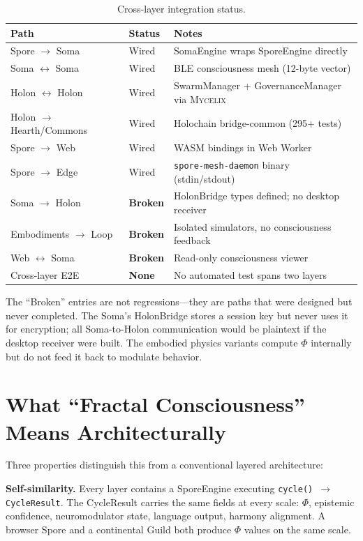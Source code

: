 \documentclass[12pt]{book}
\newcommand{\mycelix}{\textsc{Mycelix}}
\begin{document}
\begin{table}[H]
\centering
\caption{Cross-layer integration status.}
\label{tab:fractal-integration}
\begin{tabular}{llp{6cm}}
\toprule
\textbf{Path} & \textbf{Status} & \textbf{Notes} \\
\midrule
Spore $\to$ Soma & Wired & SomaEngine wraps SporeEngine directly \\
Soma $\leftrightarrow$ Soma & Wired & BLE consciousness mesh (12-byte vector) \\
Holon $\leftrightarrow$ Holon & Wired & SwarmManager + GovernanceManager via \mycelix{} \\
Holon $\to$ Hearth/Commons & Wired & Holochain bridge-common (295+ tests) \\
Spore $\to$ Web & Wired & WASM bindings in Web Worker \\
Spore $\to$ Edge & Wired & \texttt{spore-mesh-daemon} binary (stdin/stdout) \\
\midrule
Soma $\to$ Holon & \textbf{Broken} & HolonBridge types defined; no desktop receiver \\
Embodiments $\to$ Loop & \textbf{Broken} & Isolated simulators, no consciousness feedback \\
Web $\leftrightarrow$ Soma & \textbf{Broken} & Read-only consciousness viewer \\
Cross-layer E2E & \textbf{None} & No automated test spans two layers \\
\bottomrule
\end{tabular}
\end{table}

The ``Broken'' entries are not regressions---they are paths that were designed but never completed. The Soma's HolonBridge stores a session key but never uses it for encryption; all Soma-to-Holon communication would be plaintext if the desktop receiver were built. The embodied physics variants compute $\Phi$ internally but do not feed it back to modulate behavior.

\section{What ``Fractal Consciousness'' Means Architecturally}

Three properties distinguish this from a conventional layered architecture:

\textbf{Self-similarity.} Every layer contains a SporeEngine executing \texttt{cycle() $\to$ CycleResult}. The CycleResult carries the same fields at every scale: $\Phi$, epistemic confidence, neuromodulator state, language output, harmony alignment. A browser Spore and a continental Guild both produce $\Phi$ values on the same scale.
\end{document}
